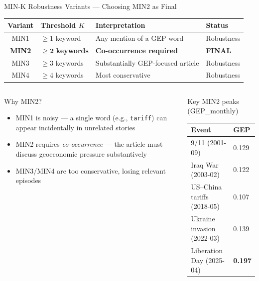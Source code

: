 \documentclass[aspectratio=169]{beamer}
\begin{document}
\begin{frame}{MIN-K Robustness Variants — Choosing MIN2 as Final}

\begin{center}
\footnotesize
\renewcommand{\arraystretch}{1.3}
\begin{tabular}{@{}clll@{}}
\toprule
\textbf{Variant} & \textbf{Threshold $K$} & \textbf{Interpretation} & \textbf{Status} \\
\midrule
\rowcolor{WUBlue!5}
MIN1 & $\geq 1$ keyword & Any mention of a GEP word & Robustness \\
\rowcolor{WUBlue!20}
\textbf{MIN2} & $\boldsymbol{\geq 2}$ \textbf{keywords} & \textbf{Co-occurrence required} & \textbf{FINAL} \\
\rowcolor{WUBlue!5}
MIN3 & $\geq 3$ keywords & Substantially GEP-focused article & Robustness \\
MIN4 & $\geq 4$ keywords & Most conservative & Robustness \\
\bottomrule
\end{tabular}
\end{center}

\bigskip
\begin{columns}[T]
\begin{block}{Why MIN2?}
\begin{itemize}\small
  \item MIN1 is noisy — a single word (e.g., \texttt{tariff}) can
        appear incidentally in unrelated stories
  \item MIN2 requires \emph{co-occurrence} — the article must
        discuss geoeconomic pressure substantively
  \item MIN3/MIN4 are too conservative, losing relevant episodes
\end{itemize}
\end{block}

\begin{block}{Key MIN2 peaks (GEP\_monthly)}
\small
\begin{tabular}{ll}
\toprule
\textbf{Event} & \textbf{GEP} \\
\midrule
9/11 (2001-09) & 0.129 \\
Iraq War (2003-02) & 0.122 \\
US--China tariffs (2018-05) & 0.107 \\
Ukraine invasion (2022-03) & 0.139 \\
Liberation Day (2025-04) & \textbf{0.197} \\
\bottomrule
\end{tabular}
\end{block}
\end{columns}

\end{frame}
\end{document}
